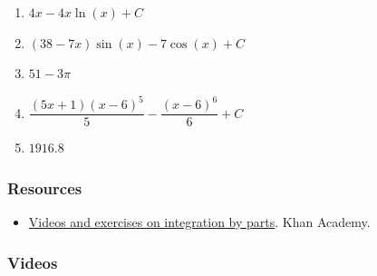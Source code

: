 \begin{enumerate}
\item $4x - 4x\ln(x) + C$
\item $(38 - 7x)\sin(x) - 7\cos(x) + C$
\item $51 - 3\pi$
\item $\dfrac{(5x+1)(x-6)^5}{5} - \dfrac{(x-6)^6}{6} + C$
\item $1916.8$
\end{enumerate}

\subsubsection{Resources}
\label{sss:reso-55b5}

\begin{itemize}

\item \href{https://www.khanacademy.org/math/integral-calculus/integration-techniques/integration_by_parts/}{Videos and exercises on integration by parts}.  
Khan Academy.

\end{itemize}

\subsubsection{Videos}
\label{sss:vide-cce3}

